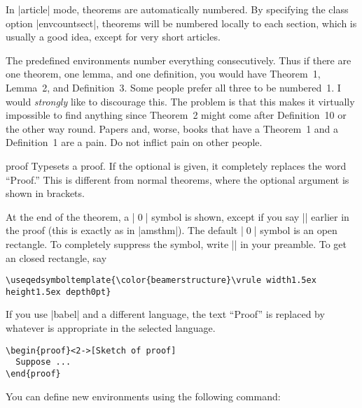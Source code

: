 \articlenote
In |article| mode, theorems are automatically numbered. By specifying
the class option |envcountsect|, theorems will be numbered locally to each
section, which is usually a good idea, except for very short
articles.

The predefined environments number everything consecutively. Thus if
there are one theorem, one lemma, and one definition, you would have
Theorem~1, Lemma~2, and Definition~3. Some people prefer all three to
be numbered~1. I would \emph{strongly} like to discourage this. The
problem is that this makes it virtually impossible to find anything
since Theorem~2 might come after Definition~10 or the other way
round. Papers and, worse, books that have a Theorem~1 and a
Definition~1 are a pain. Do not inflict pain on other people.

\begin{environment}{{proof}}
  Typesets a proof. If the optional  is given, it
  completely replaces the word ``Proof.'' This is different from
  normal theorems, where the optional argument is shown in brackets.

  At the end of the theorem, a |\qed| symbol is shown, except if you
  say |\qedhere| earlier in the proof (this is exactly as in
  |amsthm|). The default |\qed| symbol is an open rectangle. To
  completely suppress the symbol, write |\def\qedsymbol{}| in 
  your preamble. To get an closed rectangle, say
\begin{verbatim}
\useqedsymboltemplate{\color{beamerstructure}\vrule width1.5ex height1.5ex depth0pt}
\end{verbatim}

  If you use |babel| and a different language, the text ``Proof'' is
  replaced by whatever is appropriate in the selected language.

  \example
\begin{verbatim}
\begin{proof}<2->[Sketch of proof]
  Suppose ...
\end{proof}
\end{verbatim}
\end{environment}

You can define new environments using the following command:


